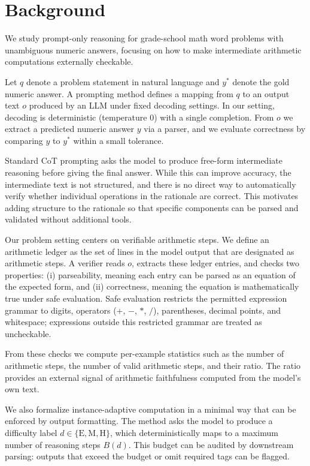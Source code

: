 \documentclass[journal,article,submit,pdftex,moreauthors]{Definitions/mdpi}
\begin{document}
\section{Background}

We study prompt-only reasoning for grade-school math word problems with unambiguous numeric answers, focusing on how to make intermediate arithmetic computations externally checkable.

Let $q$ denote a problem statement in natural language and $y^*$ denote the gold numeric answer. A prompting method defines a mapping from $q$ to an output text $o$ produced by an LLM under fixed decoding settings. In our setting, decoding is deterministic (temperature $0$) with a single completion. From $o$ we extract a predicted numeric answer $y$ via a parser, and we evaluate correctness by comparing $y$ to $y^*$ within a small tolerance.

Standard CoT prompting asks the model to produce free-form intermediate reasoning before giving the final answer. While this can improve accuracy, the intermediate text is not structured, and there is no direct way to automatically verify whether individual operations in the rationale are correct. This motivates adding structure to the rationale so that specific components can be parsed and validated without additional tools.

Our problem setting centers on verifiable arithmetic steps. We define an arithmetic ledger as the set of lines in the model output that are designated as arithmetic steps. A verifier reads $o$, extracts these ledger entries, and checks two properties: (i) parseability, meaning each entry can be parsed as an equation of the expected form, and (ii) correctness, meaning the equation is mathematically true under safe evaluation. Safe evaluation restricts the permitted expression grammar to digits, operators ($+$, $-$, $*$, $/$), parentheses, decimal points, and whitespace; expressions outside this restricted grammar are treated as uncheckable.

From these checks we compute per-example statistics such as the number of arithmetic steps, the number of valid arithmetic steps, and their ratio. The ratio provides an external signal of arithmetic faithfulness computed from the model’s own text.

We also formalize instance-adaptive computation in a minimal way that can be enforced by output formatting. The method asks the model to produce a difficulty label $d \in \{\mathrm{E},\mathrm{M},\mathrm{H}\}$, which deterministically maps to a maximum number of reasoning steps $B(d)$. This budget can be audited by downstream parsing: outputs that exceed the budget or omit required tags can be flagged.
\end{document}
